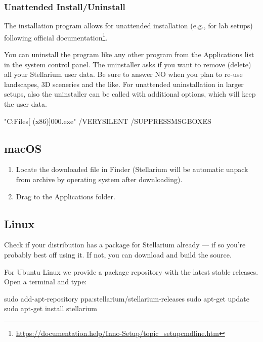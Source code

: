 \subsubsection{Unattended Install/Uninstall}
The installation program allows for unattended installation (e.g., for lab setups) 
following official documentation\footnote{\url{https://documentation.help/Inno-Setup/topic_setupcmdline.htm}}.

You can uninstall the program like any other program from the Applications list in the system control panel. 
The uninstaller asks if you want to remove (delete) all your Stellarium user data. Be sure to answer NO when you plan to re-use landscapes, 3D sceneries and the like. 
For unattended uninstallation in larger setups, also the uninstaller can be called with additional options, which will keep the user data.
\begin{commandsScr}
"C:\Program Files[ (x86)]\Stellarium\unins000.exe" /VERYSILENT /SUPPRESSMSGBOXES
\end{commandsScr}

\subsection{macOS}
\label{sec:GettingStarted:Installation:macOS}

\begin{enumerate}
\item Locate the downloaded  file in
  Finder (Stellarium will be automatic unpack from archive by operating system after downloading).
\item
  Drag  to the Applications folder.
\end{enumerate}

\subsection{Linux}
\label{sec:GettingStarted:Installation:Linux}

Check if your distribution has a package for Stellarium already --- if
so you're probably best off using it. If not, you can download and build
the source.

For Ubuntu Linux we provide a package repository with the latest stable
releases. Open a terminal and type:

\begin{commands}
sudo add-apt-repository ppa:stellarium/stellarium-releases
sudo apt-get update
sudo apt-get install stellarium
\end{commands}

